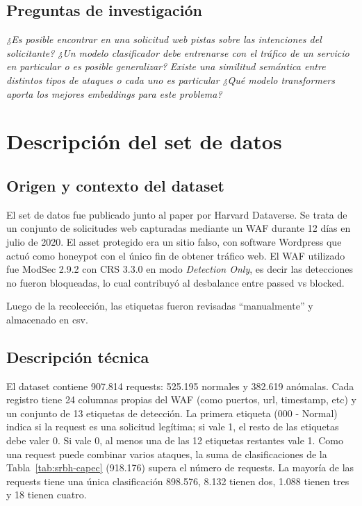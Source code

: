 \documentclass[12pt, a4paper]{article}
\begin{document}
\subsection{Preguntas de investigación}

\vspace{0.2cm}
\noindent \textit{¿Es posible encontrar en una solicitud web pistas sobre las intenciones del solicitante?}
\noindent \textit{¿Un modelo clasificador debe entrenarse con el tráfico de un servicio en particular o es posible generalizar?}
\noindent \textit{Existe una similitud semántica entre distintos tipos de ataques o cada uno es particular}
\noindent \textit{¿Qué modelo transformers aporta los mejores embeddings para este problema?}


\section{Descripción del set de datos}
\label{sec:dataset}

\subsection{Origen y contexto del dataset}

\vspace{0.2cm}
El set de datos fue publicado junto al paper \cite{sureda2022sr} por Harvard Dataverse. Se trata de un conjunto de solicitudes web capturadas mediante un WAF durante 12 días en julio de 2020. El asset protegido era un sitio falso, con software Wordpress que actuó como honeypot con el único fin de obtener tráfico web.
El WAF utilizado fue ModSec 2.9.2 con CRS 3.3.0 en modo \emph{Detection Only}, es decir las detecciones no fueron bloqueadas, lo cual contribuyó al desbalance entre passed vs blocked.

Luego de la recolección, las etiquetas fueron revisadas \enquote{manualmente} y almacenado en csv.

\subsection{Descripción técnica}


El dataset contiene 907.814 requests: 525.195 normales y 382.619
anómalas. Cada registro tiene 24 columnas propias del WAF (como puertos, url, timestamp, etc) y un conjunto de 13 etiquetas de detección.
La primera etiqueta (000 - Normal) indica si la request es una solicitud legítima; si vale 1, el resto de las etiquetas debe valer 0. Si vale 0, al menos una de las 12 etiquetas restantes vale 1. Como una request puede combinar varios ataques, la suma de clasificaciones de la Tabla~\ref{tab:srbh-capec} (918.176) supera el número de requests. La mayoría de las requests tiene una única clasificación 898.576, 8.132 tienen dos, 1.088 tienen tres y 18 tienen cuatro.
\end{document}
